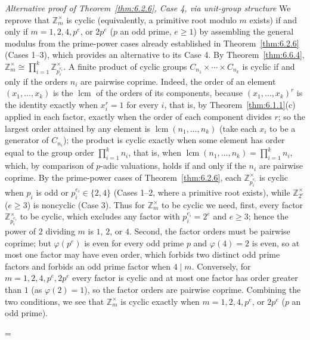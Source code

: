 \documentclass[11pt]{article}
\makeatletter
\let\nt@closedisplay\]
\def\nt@guardedclose{\@ifnextchar\par{\nt@closeafterpar}{\@ifnextchar\end{\postdisplaypenalty\@M\nt@closedisplay}{\nt@closedisplay}}}
\def\nt@closeafterpar\par{\@ifnextchar\par{\nt@closeafterpar}{\@ifnextchar\end{\postdisplaypenalty\@M\nt@closedisplay\par}{\nt@closedisplay\par}}}
\renewenvironment{proof}[1][\proofname]{\par
  \pushQED{\qed}\normalfont\topsep\medskipamount\edef\nt@afterproof{\@endparpenalty=\the\@endparpenalty\relax}\@beginparpenalty\@M\@endparpenalty\@M\let\]\nt@guardedclose\trivlist\item[]\textit{#1\@addpunct{.}} \ignorespaces}{\ifvmode\addpenalty\@M\fi\popQED\nt@afterproof\endtrivlist\@endpefalse}
\theoremstyle{ntstyle}
\newenvironment{altproof}[1][\proofname]
  {\begin{proof}[#1]\renewcommand{\qedsymbol}{}}{\end{proof}}
\newcommand{\ZmodUnits}[1]{\mathbb{Z}_{#1}^{\times}}
\DeclareMathOperator{\lcm}{lcm}
\makeatother
\begin{document}
\begin{altproof}[Alternative proof of Theorem~\ref{thm:6.2.6}, Case 4, via unit-group structure]
\label{proof:alt-6-2-6-6} We reprove that
  $\ZmodUnits{m}$ is cyclic (equivalently, a primitive root
  modulo $m$ exists) if and only if $m = 1, 2, 4, p^{e}$, or
  $2 p^{e}$ ($p$ an odd prime, $e \ge 1$) by assembling the general
  modulus from the prime-power cases already established in Theorem~\ref{thm:6.2.6} (Cases 1--3), which provides an
  alternative to its Case 4. By
  Theorem~\ref{thm:6.6.4}, $\ZmodUnits{m} \cong \prod_{i=1}^{k}\ZmodUnits{p_i^{e_i}}$. A finite product of cyclic
  groups $C_{n_1} \times \cdots \times C_{n_k}$ is cyclic if and only if the orders $n_i$ are pairwise
  coprime. Indeed, the order of an element $(x_1, \ldots, x_k)$ is the
  $\lcm$ of the orders of its components, because
  $(x_1,\ldots,x_k)^r$ is the identity exactly when $x_i^r=1$ for every
  $i$, that is, by Theorem~\ref{thm:6.1.1}(c) applied in each factor, exactly when the order of each component
  divides $r$; so the largest
  order attained by any element is $\lcm(n_1, \ldots, n_k)$ (take each $x_i$ to be a generator of $C_{n_i}$); the product is
  cyclic exactly when some element has order equal to the group order
  $\prod_{i=1}^{k}n_i$, that is, when $\lcm(n_1, \ldots, n_k) = \prod_{i=1}^{k}n_i$, which, by comparison of
  $p$-adic valuations, holds if and
  only if the $n_i$ are pairwise coprime. By the prime-power cases of Theorem~\ref{thm:6.2.6}, each
  $\ZmodUnits{p_i^{e_i}}$ is cyclic when $p_i$ is odd or
  $p_i^{e_i} \in \{2, 4\}$ (Cases 1--2, where a primitive root exists),
  while $\ZmodUnits{2^{e}}$ ($e \ge 3$) is noncyclic
  (Case 3). Thus for $\ZmodUnits{m}$ to be cyclic we need,
  first, every factor $\ZmodUnits{p_i^{e_i}}$ to be cyclic,
  which excludes any factor with $p_i^{e_i} = 2^{e}$ and $e \ge 3$; hence
  the power of $2$ dividing $m$ is $1$, $2$, or $4$. Second, the factor
  orders must be pairwise coprime; but $\varphi(p^{e})$ is even for every
  odd prime $p$ and $\varphi(4) = 2$ is even, so at most one factor may
  have even order, which forbids two distinct odd prime factors and
  forbids an odd prime factor when $4 \mid m$. Conversely, for $m = 1, 2, 4, p^{e}, 2p^{e}$ every factor is
  cyclic and at most one factor has order greater than $1$ (as $\varphi(2) = 1$), so the factor orders
  are pairwise coprime. Combining the two
  conditions, we see that $\ZmodUnits{m}$ is cyclic exactly when $m = 1, 2, 4, p^{e}$, or $2 p^{e}$ ($p$ an odd prime).

\end{altproof}
\end{document}
